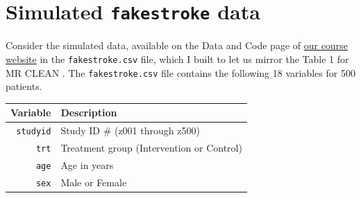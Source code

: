 \documentclass[]{book}
\theoremstyle{definition}
\theoremstyle{definition}
\theoremstyle{definition}
\theoremstyle{remark}
\begin{document}
\section{\texorpdfstring{Simulated \texttt{fakestroke}
data}{Simulated fakestroke data}}\label{simulated-fakestroke-data}

Consider the simulated data, available on the Data and Code page of
\href{https://github.com/THOMASELOVE/432-2018}{our course website} in
the \texttt{fakestroke.csv} file, which I built to let us mirror the
Table 1 for MR CLEAN \citep{Berkhemer2015}. The \texttt{fakestroke.csv}
file contains the following 18 variables for 500 patients.

\begin{longtable}[]{@{}rl@{}}
\toprule
\begin{minipage}[b]{0.16\columnwidth}\raggedleft\strut
Variable\strut
\end{minipage} & \begin{minipage}[b]{0.55\columnwidth}\raggedright\strut
Description\strut
\end{minipage}\tabularnewline
\midrule
\endhead
\begin{minipage}[t]{0.16\columnwidth}\raggedleft\strut
\texttt{studyid}\strut
\end{minipage} & \begin{minipage}[t]{0.55\columnwidth}\raggedright\strut
Study ID \# (z001 through z500)\strut
\end{minipage}\tabularnewline
\begin{minipage}[t]{0.16\columnwidth}\raggedleft\strut
\texttt{trt}\strut
\end{minipage} & \begin{minipage}[t]{0.55\columnwidth}\raggedright\strut
Treatment group (Intervention or Control)\strut
\end{minipage}\tabularnewline
\begin{minipage}[t]{0.16\columnwidth}\raggedleft\strut
\texttt{age}\strut
\end{minipage} & \begin{minipage}[t]{0.55\columnwidth}\raggedright\strut
Age in years\strut
\end{minipage}\tabularnewline
\begin{minipage}[t]{0.16\columnwidth}\raggedleft\strut
\texttt{sex}\strut
\end{minipage} & \begin{minipage}[t]{0.55\columnwidth}\raggedright\strut
Male or Female\strut
\end{minipage}\tabularnewline

\end{longtable}
\end{document}
